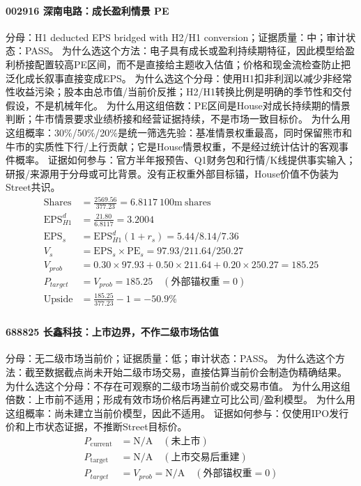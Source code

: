 \paragraph{002916 深南电路：成长盈利情景 PE}
分母：H1 deducted EPS bridged with H2/H1 conversion；证据质量：中；审计状态：PASS。
为什么选这个方法：电子具有成长或盈利持续期特征，因此模型给盈利桥接配置较高PE区间，而不是直接给主题收入估值；价格和现金流检查防止把泛化成长叙事直接变成EPS。
为什么选这个分母：使用H1扣非利润以减少非经常性收益污染；股本由总市值/当前价反推；H2/H1转换比例是明确的季节性和交付假设，不是机械年化。
为什么用这组倍数：PE区间是House对成长持续期的情景判断；牛市情景要求业绩桥接和经营证据持续，不是市场一致目标价。
为什么用这组概率：30\%/50\%/20\%是统一筛选先验：基准情景权重最高，同时保留熊市和牛市的实质性下行/上行贡献；它是House情景权重，不是经过统计估计的客观事件概率。
证据如何参与：官方半年报预告、Q1财务包和行情/K线提供事实输入；研报/来源用于分母或可比背景。没有正权重外部目标锚，House价值不伪装为Street共识。
\begin{align*}
\mathrm{Shares} &= \frac{2569.56}{377.23}=6.8117\ \mathrm{100m\ shares}\\
\mathrm{EPS}_{H1}^d &= \frac{21.80}{6.8117}=3.2004\\
\mathrm{EPS}_s &= \mathrm{EPS}_{H1}^d(1+r_s)=5.44/8.14/7.36\\
V_s &= \mathrm{EPS}_s\times \mathrm{PE}_s=97.93/211.64/250.27\\
V_{prob} &= 0.30\times 97.93+0.50\times 211.64+0.20\times 250.27=185.25\\
P_{target} &= V_{prob}=185.25\quad(\text{外部锚权重}=0)\\
\mathrm{Upside} &= \frac{185.25}{377.23}-1=-50.9\%\\
\end{align*}

\paragraph{688825 长鑫科技：上市边界，不作二级市场估值}
分母：无二级市场当前价；证据质量：低；审计状态：PASS。
为什么选这个方法：截至数据截点尚未开始二级市场交易，直接估算当前价会制造伪精确结果。
为什么选这个分母：不存在可观察的二级市场当前价或交易市值。
为什么用这组倍数：上市前不适用；形成有效市场价格后再建立可比公司/盈利模型。
为什么用这组概率：尚未建立当前价模型，因此不适用。
证据如何参与：仅使用IPO发行价和上市状态证据，不推断Street目标价。
\begin{align*}
P_{\mathrm{current}} &= \mathrm{N/A}\quad(\text{未上市})\\
P_{\mathrm{target}} &= \mathrm{N/A}\quad(\text{上市交易后重建})\\
P_{target} &= V_{prob}=\mathrm{N/A}\quad(\text{外部锚权重}=0)\\
\end{align*}

